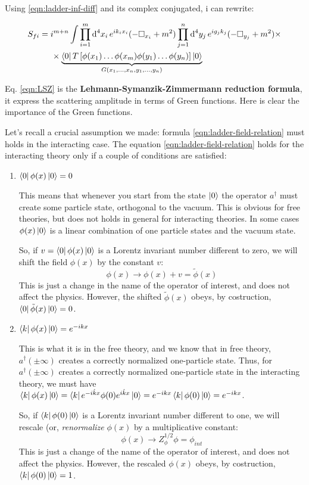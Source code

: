 \documentclass[../main/main.tex]{subfiles}
\begin{document}
Using \eqref{eqn:ladder-inf-diff} and its complex conjugated, i can rewrite:
\begin{mdframed}[style=mybox]
\begin{equation}\label{eqn:LSZ}\begin{split}
S_{fi}
&=i^{m+n}\int
\prod_{i=1}^m\textup{d}^4x_i\,e^{ik_ix_i}(-\square_{x_i}+m^2)
\prod_{j=1}^n\textup{d}^4y_j\,e^{ig_jk_j}(-\square_{y_j}+m^2)\times\\
&\hspace{0.5cm}\times
\underbrace{\bra0 T\left[\phi(x_1)\dots\phi(x_m)\phi(y_1)\dots\phi(y_n)\right]\ket0}_{G(x_1,\dots,x_n,y_1,\dots,y_n)}
\end{split}\end{equation}
\end{mdframed}

Eq. \eqref{eqn:LSZ} is the \textbf{Lehmann-Symanzik-Zimmermann reduction formula}, it express the scattering amplitude in terms of Green functions. Here is clear the importance of the Green functions.

Let's recall a crucial assumption we made: formula \eqref {eqn:ladder-field-relation} must holds in the interacting case.
The equation  \eqref {eqn:ladder-field-relation} holds for the interacting theory only if a couple of conditions are satisfied:
\begin{enumerate}
\item $\bra0\phi(x)\ket0=0$

This means that whenever you start from the state $\ket0$ the operator $a^\dagger$ must create some particle state, orthogonal to the vacuum. This is obvious for free theories, but does not holds in general for interacting theories. In some cases $\phi(x)\ket0$ is a linear combination of one particle states and the vacuum state. 

So, if $v=\bra0\phi(x)\ket0$ is a Lorentz invariant number different to zero, we will shift the field $\phi(x)$ by the constant $v$:
\[\phi(x)\rightarrow\phi(x)+v=\tilde \phi(x)\]
This is just a change in the name of the operator of interest, and does not affect the physics. However, the shifted $\tilde\phi(x)$ obeys, by costruction, $\bra0\tilde\phi(x)\ket0=0$.
\item $\bra k\phi(x)\ket 0=e^{-ikx}$

This is what it is in the free theory, and we know that in free theory, $a^\dagger(\pm\infty)$ creates a correctly normalized one-particle state. Thus, for $a^\dagger(\pm\infty)$ creates a correctly normalized one-particle state in the interacting theory, we must have $\bra k\phi(x)\ket 0=\bra ke^{-i\hat kx}\phi(0)e^{i\hat kx}\ket0=e^{-ikx}\bra k\phi(0)\ket 0=e^{-ikx}$.

So, if $\bra k\phi(0)\ket 0$ is a Lorentz invariant number different to one, we will rescale (or, \emph{renormalize} $\phi(x)$ by a multiplicative constant:
\[\phi(x)\rightarrow Z_{\phi}^{1/2}\phi=\phi_{int}\]
 This is just a change of the name of the operator of interest, and does not affect the physics. However, the rescaled $\phi(x)$ obeys, by costruction, $\bra k\phi(0)\ket 0=1$.
\end{enumerate}
\end{document}
